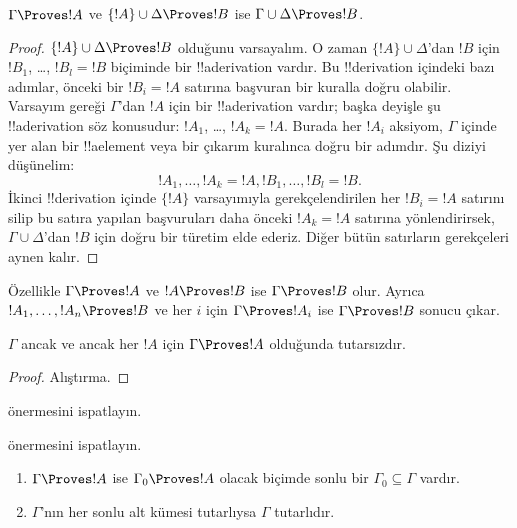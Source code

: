 \documentclass[../../../include/open-logic-section]{subfiles}
\begin{document}
\begin{prop}[Geçişlilik]
$\Gamma \Proves !A$ ve $\{!A\} \cup \Delta \Proves !B$ ise
$\Gamma \cup \Delta \Proves !B$.
\end{prop}

\begin{proof}
  $\{!A\} \cup \Delta \Proves !B$ olduğunu varsayalım. O zaman
  $\{!A\} \cup \Delta$'dan $!B$ için $!B_1$, \dots, $!B_l = !B$
  biçiminde bir !!a{derivation} vardır. Bu !!{derivation} içindeki bazı
  adımlar, önceki bir $!B_i = !A$ satırına başvuran bir kuralla doğru
  olabilir. Varsayım gereği $\Gamma$'dan $!A$ için bir !!a{derivation}
  vardır; başka deyişle şu !!a{derivation} söz konusudur:
  $!A_1$, \dots, $!A_k = !A$. Burada her $!A_i$ aksiyom, $\Gamma$ içinde
  yer alan bir !!a{element} veya bir çıkarım kuralınca doğru bir adımdır.
  Şu diziyi düşünelim:
  \[
  !A_1, \dots, !A_k = !A, !B_1, \dots, !B_l = !B.
  \]
  İkinci !!{derivation} içinde $\{!A\}$ varsayımıyla gerekçelendirilen her
  $!B_i=!A$ satırını silip bu satıra yapılan başvuruları daha önceki
  $!A_k=!A$ satırına yönlendirirsek, $\Gamma\cup\Delta$'dan $!B$ için doğru
  bir türetim elde ederiz. Diğer bütün satırların gerekçeleri aynen
  kalır.
\end{proof}

Özellikle $\Gamma \Proves !A$ ve $!A \Proves !B$ ise $\Gamma \Proves !B$
olur. Ayrıca $!A_1, \dots, !A_n \Proves !B$ ve her $i$ için
$\Gamma \Proves !A_i$ ise $\Gamma \Proves !B$ sonucu çıkar.

\begin{prop}
$\Gamma$ ancak ve ancak her $!A$ için $\Gamma \Proves !A$ olduğunda
tutarsızdır.
\end{prop}

\begin{proof}
Alıştırma.
\end{proof}

\begin{prob}
 önermesini ispatlayın.
\end{prob}
\tagendprob

\begin{prob}
 önermesini ispatlayın.
\end{prob}
\tagendprob

\begin{prop}[Kompaktlık]
  \begin{enumerate}
  \item $\Gamma \Proves !A$ ise $\Gamma_0 \Proves !A$ olacak biçimde sonlu
    bir $\Gamma_0 \subseteq \Gamma$ vardır.
  \item $\Gamma$'nın her sonlu alt kümesi tutarlıysa $\Gamma$ tutarlıdır.
  \end{enumerate}
\end{prop}
\end{document}
